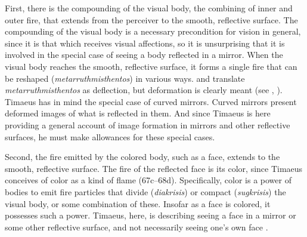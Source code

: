 
First, there is the compounding of the visual body, the combining of inner and outer fire, that extends from the perceiver to the smooth, reflective surface. The compounding of the visual body is a necessary precondition for vision in general, since it is that which receives visual affections, so it is unsurprising that it is involved in the special case of seeing a body reflected in a mirror. When the visual body reaches the smooth, reflective surface, it forms a single fire that can be reshaped (\emph{metarruthmisthentos}) in various ways. \citet[159]{Archer-Hind:1888qd} and \citet[103]{Bury:1929jb} translate \emph{metarruthmisthentos} as deflection, but deformation is clearly meant (see \citealt[287]{Taylor:1928qb}, \citealt[154]{Cornford:1935fk}). Timaeus has in mind the special case of curved mirrors. Curved mirrors present deformed images of what is reflected in them. And since Timaeus is here providing a general account of image formation in mirrors and other reflective surfaces, he must make allowances for these special cases. 

Second, the fire emitted by the colored body, such as a face, extends to the smooth, reflective surface. The fire of the reflected face is its color, since Timaeus conceives of color as a kind of flame (67c–68d). Specifically, color is a power of bodies to emit fire particles that divide (\emph{diakrisis}) or compact (\emph{sugkrisis}) the visual body, or some combination of these. Insofar as a face is colored, it possesses such a power. Timaeus, here, is describing seeing a face in a mirror or some other reflective surface, and not necessarily seeing one's own face \citep[286--7]{Taylor:1928qb}. 

